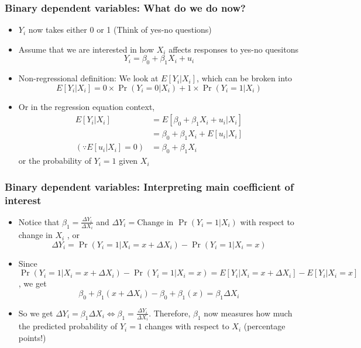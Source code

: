 \documentclass[aspectratio=169]{beamer}
\begin{document}
\begin{frame}
\frametitle{Binary dependent variables: What do we do now?}
\begin{itemize}
\item $Y_i$ now  takes either 0 or 1 (Think of yes-no questions)
\item Assume that we are interested in how $X_i$ affects responses to yes-no quesitons
\[
Y_i = \beta_0 + \beta_1 X_i +u_i
\]
\item Non-regressional definition: We look at $E[Y_i|X_i]$, which can be broken into 
\[
E[Y_i|X_i] = 0\times\Pr(Y_i=0|X_i)+1\times\Pr(Y_i=1|X_i)
\]
\item Or in the regression equation context, 
\[
\begin{aligned}
E[Y_i|X_i]&=E[\beta_0+\beta_1X_i+u_i|X_i]\\
&=\beta_0 + \beta_1X_i + E[u_i|X_i]\\
(\because  E[u_i|X_i]=0)&=\beta_0 + \beta_1X_i 
\end{aligned}
\]
or the probability of $Y_i=1$ given $X_i$
\end{itemize}
\end{frame}

\begin{frame}
\frametitle{Binary dependent variables: Interpreting main coefficient of interest}
\begin{itemize}
\item Notice that $\beta_1 =\frac{\Delta Y_i}{\Delta X_i}$ and $\Delta Y_i = \text{Change in }\Pr(Y_i=1|X_i)$ with respect to change in $X_i$ , or
\[
\Delta Y_i = \Pr(Y_i=1|X_i=x+\Delta X_i)-\Pr(Y_i=1|X_i=x)
\]
\item Since $\Pr(Y_i=1|X_i=x+\Delta X_i)-\Pr(Y_i=1|X_i=x)=E[Y_i|X_i=x+\Delta X_i]-E[Y_i|X_i=x]$, we get
\[
\beta_0+\beta_1(x+\Delta X_i)-\beta_0+\beta_1(x) =\beta_1 \Delta X_i
\]
\item So we get $\Delta Y_i = \beta_1\Delta X_i\iff\beta_1 =\frac{\Delta Y_i}{\Delta X_i}$. Therefore, $\beta_1$ now measures how much the predicted probability of $Y_i=1$ changes with respect to $X_i$ (percentage points!)
\end{itemize}
\end{frame}
\end{document}

